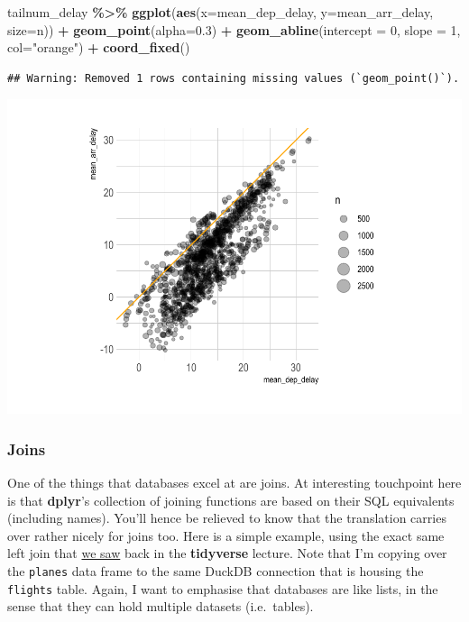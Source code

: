 \documentclass[
]{article}
\newenvironment{Shaded}{\begin{snugshade}}{\end{snugshade}}
\newcommand{\AttributeTok}[1]{\textcolor[rgb]{0.13,0.29,0.53}{#1}}
\newcommand{\DecValTok}[1]{\textcolor[rgb]{0.00,0.00,0.81}{#1}}
\newcommand{\FloatTok}[1]{\textcolor[rgb]{0.00,0.00,0.81}{#1}}
\newcommand{\FunctionTok}[1]{\textcolor[rgb]{0.13,0.29,0.53}{\textbf{#1}}}
\newcommand{\NormalTok}[1]{#1}
\newcommand{\SpecialCharTok}[1]{\textcolor[rgb]{0.81,0.36,0.00}{\textbf{#1}}}
\newcommand{\StringTok}[1]{\textcolor[rgb]{0.31,0.60,0.02}{#1}}
\begin{document}
\begin{Shaded}
\begin{Highlighting}[]
\NormalTok{tailnum\_delay }\SpecialCharTok{\%\textgreater{}\%}
  \FunctionTok{ggplot}\NormalTok{(}\FunctionTok{aes}\NormalTok{(}\AttributeTok{x=}\NormalTok{mean\_dep\_delay, }\AttributeTok{y=}\NormalTok{mean\_arr\_delay, }\AttributeTok{size=}\NormalTok{n)) }\SpecialCharTok{+}
  \FunctionTok{geom\_point}\NormalTok{(}\AttributeTok{alpha=}\FloatTok{0.3}\NormalTok{) }\SpecialCharTok{+}
  \FunctionTok{geom\_abline}\NormalTok{(}\AttributeTok{intercept =} \DecValTok{0}\NormalTok{, }\AttributeTok{slope =} \DecValTok{1}\NormalTok{, }\AttributeTok{col=}\StringTok{"orange"}\NormalTok{) }\SpecialCharTok{+}
  \FunctionTok{coord\_fixed}\NormalTok{()}
\end{Highlighting}
\end{Shaded}

\begin{verbatim}
## Warning: Removed 1 rows containing missing values (`geom_point()`).
\end{verbatim}

\includegraphics{16-databases_files/figure-latex/tailnum_delay_ggplot-1.pdf}

\hypertarget{joins}{%
\subsubsection{Joins}\label{joins}}

One of the things that databases excel at are joins. At interesting
touchpoint here is that \textbf{dplyr}'s collection of joining functions
are based on their SQL equivalents (including names). You'll hence be
relieved to know that the translation carries over rather nicely for
joins too. Here is a simple example, using the exact same left join that
\href{https://raw.githack.com/uo-ec607/lectures/master/05-tidyverse/05-tidyverse.html\#joins}{we
saw} back in the \textbf{tidyverse} lecture. Note that I'm copying over
the \texttt{planes} data frame to the same DuckDB connection that is
housing the \texttt{flights} table. Again, I want to emphasise that
databases are like lists, in the sense that they can hold multiple
datasets (i.e.~tables).
\end{document}
